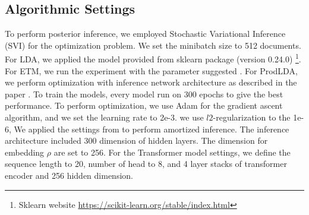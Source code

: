 \subsection{Algorithmic Settings}
To perform posterior inference, we employed Stochastic Variational Inference (SVI) \cite{hoffman_stochastic_2013} for the optimization problem. We set the minibatch size to 512 documents.
For LDA, we applied the model provided from sklearn package (version 0.24.0) \footnote{Sklearn website \url{https://scikit-learn.org/stable/index.html}}. For ETM, we run the experiment with the parameter suggested \cite{dieng_topic_2019}. For ProdLDA, we perform optimization with inference network architecture as described in the paper \cite{srivastava_autoencoding_2017}. 
To train the models, every model run on 300 epochs to give the best performance. 
To perform optimization, we use Adam for the gradient ascent algorithm, and we set the learning rate to 2e-3.
we use $ l2 $-regularization to the 1e-6,
We applied the settings from \cite{srivastava_autoencoding_2017} to perform amortized inference. The inference architecture included 300 dimension of hidden layers. 
The dimension for embedding $ \rho $ are set to 256.
For the Transformer model settings, we define the sequence length to 20, number of head to 8, and 4 layer stacks of transformer encoder and 256 hidden dimension.
